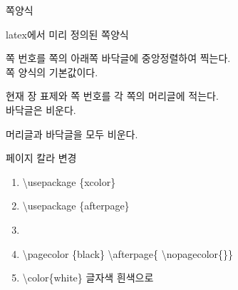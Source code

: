 \documentclass[ aspectratio=149,  14pt,blue,xcolor=pdftex,dvipsnames,table,handout,notes]{beamer}
\begin{document}
		\begin{frame}[t]{쪽양식}

			\begin{block} {latex에서 미리 정의된 쪽양식}
			\begin{description}[1234567890]
			\item [\textbf{plain}] 쪽 번호를 쪽의 아래쪽 바닥글에 중앙정렬하여 찍는다.\\
								쪽 양식의 기본값이다.
			\item [\textbf{headings}] 현재 장 표제와 쪽 번호를 각 쪽의 머리글에 적는다.\\
								바닥글은 비운다.
			\item [\textbf{empty}] 머리글과 바닥글을 모두 비운다.
			\end{description}
			\end{block}


			\begin{block} {페이지 칼라 변경}
			\begin{enumerate}
			\item	\textbackslash usepackage \{xcolor\} 
			\item	\textbackslash usepackage \{afterpage\}
			\item	
			\item	\textbackslash pagecolor \{black\} \textbackslash  afterpage\{ \textbackslash  nopagecolor\{\}\}
			\item	\textbackslash color\{white\} 글자색 흰색으로
			\end{enumerate}
			\end{block}


		\end{frame}
\end{document}
